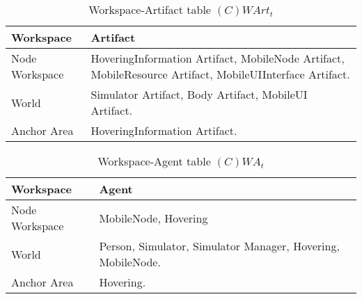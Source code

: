 \begin{table}[H]
	\centering
	\begin{tabular}{|p{4cm}|p{8cm}|}
			\hline
			\textbf{Workspace} & \textbf{Artifact} \\
			\hline
			Node Workspace & HoveringInformation Artifact, MobileNode Artifact,
			MobileResource Artifact, MobileUIInterface Artifact. \\
			\hline
      World & Simulator Artifact, Body Artifact, MobileUI Artifact. \\
			\hline
			Anchor Area & HoveringInformation Artifact. \\
			\hline
		\end{tabular}
	\caption{Workspace-Artifact table $(C)WArt_t$}
	\label{tab:cwartt}
\end{table}

\begin{table}[H]
	\centering
	\begin{tabular}{|p{4cm}|p{8cm}|}
			\hline
			\textbf{Workspace} & \textbf{Agent} \\
			\hline
			Node Workspace & MobileNode, Hovering \\
			\hline
      World & Person, Simulator, Simulator Manager, Hovering, MobileNode. \\
			\hline
			Anchor Area & Hovering. \\
			\hline
		\end{tabular}
	\caption{Workspace-Agent table $(C)WA_t$}
	\label{tab:cwat}
\end{table}
